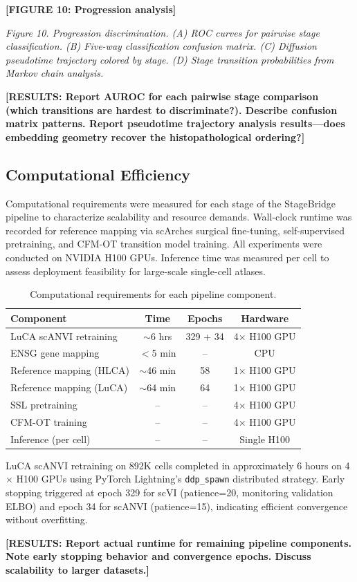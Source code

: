 \textbf{[FIGURE 10: Progression analysis]}

\textit{Figure 10. Progression discrimination. (A) ROC curves for pairwise stage classification. (B) Five-way classification confusion matrix. (C) Diffusion pseudotime trajectory colored by stage. (D) Stage transition probabilities from Markov chain analysis.}

\textbf{[RESULTS: Report AUROC for each pairwise stage comparison (which transitions are hardest to discriminate?). Describe confusion matrix patterns. Report pseudotime trajectory analysis results---does embedding geometry recover the histopathological ordering?]}


\subsection{Computational Efficiency}

Computational requirements were measured for each stage of the StageBridge pipeline to characterize scalability and resource demands. Wall-clock runtime was recorded for reference mapping via scArches surgical fine-tuning, self-supervised pretraining, and CFM-OT transition model training. All experiments were conducted on NVIDIA H100 GPUs. Inference time was measured per cell to assess deployment feasibility for large-scale single-cell atlases.

\begin{table}[h]
\centering
\caption{Computational requirements for each pipeline component.}
\label{tab:compute}
\begin{tabular}{lccc}
\toprule
\textbf{Component} & \textbf{Time} & \textbf{Epochs} & \textbf{Hardware} \\
\midrule
LuCA scANVI retraining & $\sim$6 hrs & 329 + 34 & 4$\times$ H100 GPU \\
ENSG gene mapping & $<$5 min & -- & CPU \\
Reference mapping (HLCA) & $\sim$46 min & 58 & 1$\times$ H100 GPU \\
Reference mapping (LuCA) & $\sim$64 min & 64 & 1$\times$ H100 GPU \\
SSL pretraining & -- & -- & 4$\times$ H100 GPU \\
CFM-OT training & -- & -- & 4$\times$ H100 GPU \\
Inference (per cell) & -- & -- & Single H100 \\
\bottomrule
\end{tabular}
\end{table}

LuCA scANVI retraining on 892K cells completed in approximately 6 hours on 4$\times$ H100 GPUs using PyTorch Lightning's \texttt{ddp\_spawn} distributed strategy. Early stopping triggered at epoch 329 for scVI (patience=20, monitoring validation ELBO) and epoch 34 for scANVI (patience=15), indicating efficient convergence without overfitting.

\textbf{[RESULTS: Report actual runtime for remaining pipeline components. Note early stopping behavior and convergence epochs. Discuss scalability to larger datasets.]}

